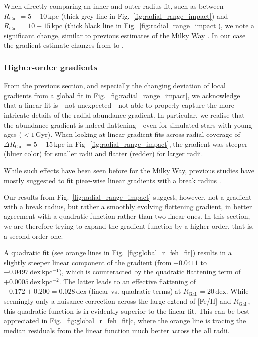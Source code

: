 \documentclass[fleqn,usenatbib]{mnras}
\begin{document}
When directly comparing an inner and outer radius fit, such as between $R_\mathrm{Gal.} = 5-10\,\mathrm{kpc}$ (thick grey line in Fig.~\ref{fig:radial_range_impact}) and $R_\mathrm{Gal.} = 10-15\,\mathrm{kpc}$ (thick black line in Fig.~\ref{fig:radial_range_impact}), we note a significant change, similar to previous estimates of the Milky Way \citep[e.g.][]{Yong2012, Lemasle2008}. In our case the gradient estimate changes from  to .

\subsubsection{Higher-order gradients} \label{sec:non-linear_component}

From the previous section, and especially the changing deviation of local gradients from a global fit in Fig.~\ref{fig:radial_range_impact}, we acknowledge that a linear fit is - not unexpected - not able to properly capture the more intricate details of the radial abundance gradient. In particular, we realise that the abundance gradient is indeed flattening - even for simulated stars with young ages ($< 1\,\mathrm{Gyr}$). When looking at linear gradient fits across radial coverage of $\Delta R_\mathrm{Gal.} = 5-15\,\mathrm{kpc}$ in Fig.~\ref{fig:radial_range_impact}, the gradient was steeper (bluer color) for smaller radii and flatter (redder) for larger radii.

While such effects have been seen before for the Milky Way, previous studies have mostly suggested to fit piece-wise linear gradients with a break radius \citep[e.g.][]{Andrievsky2002, Yong2012, Boeche2013, Hayden2014, Anders2017, Donor2020}.

Our results from Fig.~\ref{fig:radial_range_impact} suggest, however, not a gradient with a break radius, but rather a smoothly evolving flattening gradient, in better agreement with a quadratic function rather than two linear ones. In this section, we are therefore trying to expand the gradient function by a higher order, that is, a second order one.

A quadratic fit (see orange lines in Fig.~\ref{fig:global_r_feh_fit}) results in a slightly steeper linear component of the gradient (from $-0.0411$ to $-0.0497\,\mathrm{dex\,kpc^{-1}}$), which is counteracted by the quadratic flattening term of $+0.0005\,\mathrm{dex\,kpc^{-2}}$. The latter leads to an effective flattening of $-0.172 + 0.200 = 0.028\,\mathrm{dex}$ (linear vs. quadratic terms) at $R_\mathrm{Gal.} = 20\,\mathrm{dex}$. While seemingly only a nuisance correction across the large extend of [Fe/H] and $R_\mathrm{Gal.}$, this quadratic function is in evidently superior to the linear fit. This can be best appreciated in Fig.~\ref{fig:global_r_feh_fit}c, where the orange line is tracing the median residuals from the linear function much better across the all radii.
\end{document}
